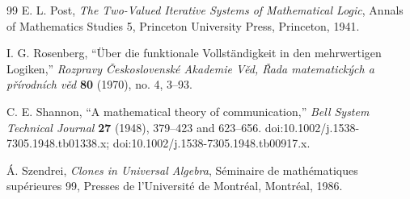 \documentclass[11pt]{article}
\theoremstyle{definition}
\begin{document}
\begin{thebibliography}{99}
 E. L. Post, \emph{The Two-Valued Iterative Systems of Mathematical
Logic}, Annals of Mathematics Studies 5, Princeton University Press,
Princeton, 1941.

 I. G. Rosenberg, ``Über die funktionale Vollständigkeit in den
mehrwertigen Logiken,'' \emph{Rozpravy Československé Akademie Věd, Řada
matematických a přírodních věd} \textbf{80} (1970), no. 4, 3--93.

 C. E. Shannon, ``A mathematical theory of communication,'' \emph{Bell
System Technical Journal} \textbf{27} (1948), 379--423 and 623--656.
doi:10.1002/j.1538-7305.1948.tb01338.x;
doi:10.1002/j.1538-7305.1948.tb00917.x.

 Á. Szendrei, \emph{Clones in Universal Algebra}, Séminaire de
mathématiques supérieures 99, Presses de l'Université de Montréal,
Montréal, 1986.
\end{thebibliography}
\end{document}
